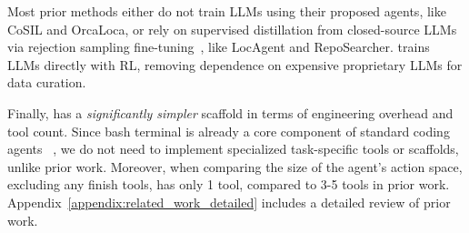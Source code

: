% 
Most prior methods either do not train LLMs using their proposed agents, like CoSIL and OrcaLoca, or rely on supervised distillation from closed-source LLMs via rejection sampling fine-tuning~\citep{yuan2023scalingrelationshiplearningmathematical}, like LocAgent and RepoSearcher. \methodname trains LLMs directly with RL, removing dependence on expensive proprietary LLMs for data curation.

Finally, \methodname has a \emph{significantly simpler} scaffold in terms of engineering overhead and tool count. Since bash terminal is already a core component of standard coding agents ~\citep{wang2025openhandssoftwareagentsdk, yang2024sweagentagentcomputerinterfacesenable, anthropic_claude_code_2025}, we do not need to implement specialized task-specific tools or scaffolds, unlike prior work. Moreover, when comparing the size of the agent's action space, excluding any finish tools, \methodname has only 1 tool, compared to 3-5 tools in prior work. Appendix~\ref{appendix:related_work_detailed} includes a detailed review of prior work.




